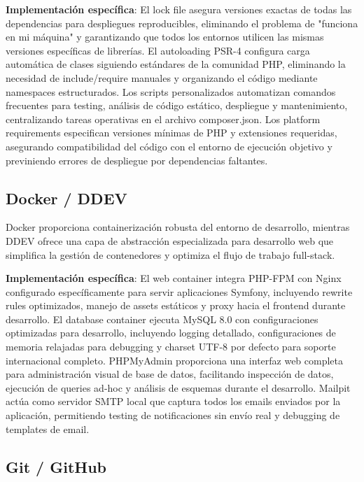 \documentclass[12pt,a4paper,oneside]{report}
\begin{document}
\textbf{Implementación específica}: El lock file asegura versiones exactas de todas las dependencias para despliegues reproducibles, eliminando el problema de "funciona en mi máquina" y garantizando que todos los entornos utilicen las mismas versiones específicas de librerías. El autoloading PSR-4 configura carga automática de clases siguiendo estándares de la comunidad PHP, eliminando la necesidad de include/require manuales y organizando el código mediante namespaces estructurados. Los scripts personalizados automatizan comandos frecuentes para testing, análisis de código estático, despliegue y mantenimiento, centralizando tareas operativas en el archivo composer.json. Los platform requirements especifican versiones mínimas de PHP y extensiones requeridas, asegurando compatibilidad del código con el entorno de ejecución objetivo y previniendo errores de despliegue por dependencias faltantes.

\subsection{Docker / DDEV}\label{docker-ddev}

Docker proporciona containerización robusta del entorno de desarrollo, mientras DDEV ofrece una capa de abstracción especializada para desarrollo web que simplifica la gestión de contenedores y optimiza el flujo de trabajo full-stack.

\textbf{Implementación específica}: El web container integra PHP-FPM con Nginx configurado específicamente para servir aplicaciones Symfony, incluyendo rewrite rules optimizados, manejo de assets estáticos y proxy hacia el frontend durante desarrollo. El database container ejecuta MySQL 8.0 con configuraciones optimizadas para desarrollo, incluyendo logging detallado, configuraciones de memoria relajadas para debugging y charset UTF-8 por defecto para soporte internacional completo. PHPMyAdmin proporciona una interfaz web completa para administración visual de base de datos, facilitando inspección de datos, ejecución de queries ad-hoc y análisis de esquemas durante el desarrollo. Mailpit actúa como servidor SMTP local que captura todos los emails enviados por la aplicación, permitiendo testing de notificaciones sin envío real y debugging de templates de email.

\subsection{Git / GitHub}\label{git-github}
\end{document}
